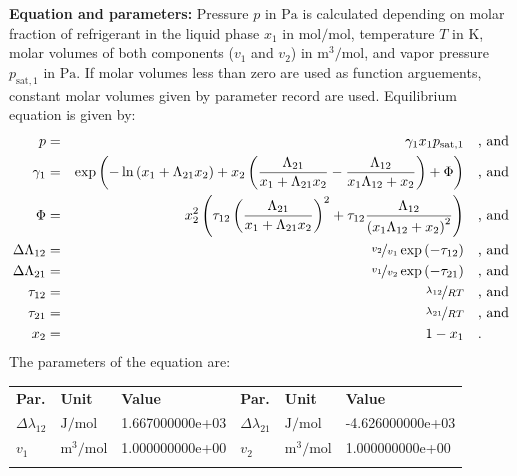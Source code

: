 \textbf{Equation and parameters:}
\newline
%
Pressure $p$ in $\si{\pascal}$ is calculated depending on molar fraction of refrigerant in the liquid phase $x_1$ in $\si{\mole\per\mole}$, temperature $T$ in $\si{\kelvin}$, molar volumes of both components ($v_1$ and $v_2$) in $\si{\cubic\meter\per\mole}$, and vapor pressure $p_\mathrm{sat,1}$ in $\si{\pascal}$. If molar volumes less than zero are used as function arguements, constant molar volumes given by parameter record are used. Equilibrium equation is given by:
%
\begin{equation*}
\begin{split}
p &=& \gamma_1 x_1 p_\mathrm{sat,1} & \quad\text{, and} \\
\gamma_1 &=& \exp \left( - \ln \left( x_1 + \Lambda_{21} x_2 \right) + x_2 \left( \frac{\Lambda_{21}}{x_1 + \Lambda_{21} x_2} - \frac{\Lambda_{12}}{x_1 \Lambda_{12} + x_2} \right) + \Phi \right) & \quad\text{, and} \\
\Phi &=& x_2^2 \left( \tau_{12} \left( \frac{\Lambda_{21}}{x_1 + \Lambda_{21} x_2} \right) ^2 + \tau_{12} \frac{\Lambda_{12}}{\left( x_1 \Lambda_{12} + x_2 \right) ^2}  \right) & \quad\text{, and} \\
\Delta\Lambda_{12} &=& \nicefrac{v_2}{v_1} \exp \left( - \tau_{12} \right) & \quad\text{, and} \\
\Delta\Lambda_{21} &=& \nicefrac{v_1}{v_2} \exp \left( - \tau_{21} \right) & \quad\text{, and} \\
\tau_{12} &=& \nicefrac{\lambda_{12}}{R T} & \quad\text{, and} \\
\tau_{21} &=& \nicefrac{\lambda_{21}}{R T} & \quad\text{, and} \\
x_2 &=& 1 - x_1  & \quad\text{.} \\
\end{split}
\end{equation*}
%
The parameters of the equation are:
%
\begin{longtable}[l]{lll|lll}
\toprule
\addlinespace
\textbf{Par.} & \textbf{Unit} & \textbf{Value} &	\textbf{Par.} & \textbf{Unit} & \textbf{Value} \\
\addlinespace
\midrule
\endhead

\bottomrule
\endfoot
\bottomrule
\endlastfoot
\addlinespace

$\Delta\lambda_{12}$ & $\si{\joule\per\mole}$ & 1.667000000e+03 & $\Delta\lambda_{21}$ & $\si{\joule\per\mole}$ & -4.626000000e+03 \\
$v_1$ & $\si{\cubic\meter\per\mole}$ & 1.000000000e+00 & $v_2$ & $\si{\cubic\meter\per\mole}$ & 1.000000000e+00 \\

\addlinespace\end{longtable}

